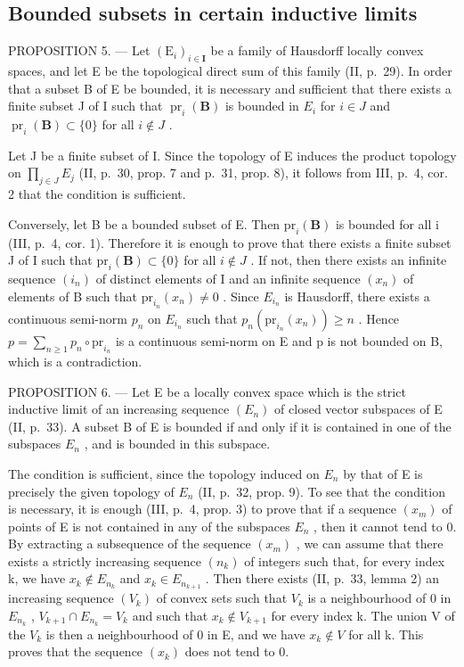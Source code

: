 \subsection{Bounded subsets in certain inductive limits}

PROPOSITION 5. --- Let \((\mathrm{E}_{i})_{i\in\mathbf{I}}\) be a family of Hausdorff locally convex spaces, and let E be the topological direct sum of this family (II, p.~29). In order that a subset B of E be bounded, it is necessary and sufficient that there exists a finite subset J of I such that \(\operatorname{pr}_{i}(\mathbf{B})\) is bounded in \(E_{i}\) for \(i\in J\) and \(\operatorname{pr}_{i}(\mathbf{B})\subset\{0\}\) for all \(i\notin J\) .

Let J be a finite subset of I. Since the topology of E induces the product topology on \(\prod_{j\in J}E_{j}\) (II, p.~30, prop. 7 and p.~31, prop. 8), it follows from III, p.~4, cor. 2 that the condition is sufficient.

Conversely, let B be a bounded subset of E. Then \(\mathrm{pr}_{i}(\mathbf{B})\) is bounded for all i (III, p.~4, cor. 1). Therefore it is enough to prove that there exists a finite subset J of I such that \(\mathrm{pr}_{i}(\mathbf{B}) \subset \{0\}\) for all \(i \notin J\) . If not, then there exists an infinite sequence \((i_{n})\) of distinct elements of I and an infinite sequence \((x_{n})\) of elements of B such that \(\mathrm{pr}_{i_{n}}(x_{n}) \neq 0\) . Since \(E_{i_{n}}\) is Hausdorff, there exists a continuous semi-norm \(p_{n}\) on \(E_{i_{n}}\) such that \(p_{n}(\mathrm{pr}_{i_{n}}(x_{n})) \geqslant n\) . Hence \(p = \sum_{n \geqslant 1} p_{n} \circ \mathrm{pr}_{i_{n}}\) is a continuous semi-norm on E and p is not bounded on B, which is a contradiction.

PROPOSITION 6. --- Let E be a locally convex space which is the strict inductive limit of an increasing sequence \((E_{n})\) of closed vector subspaces of E (II, p.~33). A subset B of E is bounded if and only if it is contained in one of the subspaces \(E_{n}\) , and is bounded in this subspace.

The condition is sufficient, since the topology induced on \(E_{n}\) by that of E is precisely the given topology of \(E_{n}\) (II, p.~32, prop. 9). To see that the condition is necessary, it is enough (III, p.~4, prop. 3) to prove that if a sequence \((x_{m})\) of points of E is not contained in any of the subspaces \(E_{n}\) , then it cannot tend to 0. By extracting a subsequence of the sequence \((x_{m})\) , we can assume that there exists a strictly increasing sequence \((n_{k})\) of integers such that, for every index k, we have \(x_{k} \notin E_{n_{k}}\) and \(x_{k} \in E_{n_{k+1}}\) . Then there exists (II, p.~33, lemma 2) an increasing sequence \((V_{k})\) of convex sets such that \(V_{k}\) is a neighbourhood of 0 in \(E_{n_{k}}\) , \(V_{k+1} \cap E_{n_{k}} = V_{k}\) and such that \(x_{k} \notin V_{k+1}\) for every index k. The union V of the \(V_{k}\) is then a neighbourhood of 0 in E, and we have \(x_{k} \notin V\) for all k. This proves that the sequence \((x_{k})\) does not tend to 0.

